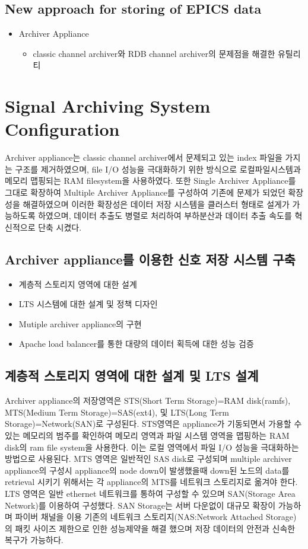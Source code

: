 \documentclass[11pt
  , a4paper
  , article
  , oneside
]{memoir}
\begin{document}
\subsection{New approach for storing of EPICS data}
\begin{itemize}
	\item Archiver Appliance
	\begin{itemize}
		\item classic channel archiver와 RDB channel archiver의 문제점을 해결한 유틸리티
	\end{itemize}
\end{itemize}
\section{Signal Archiving System Configuration}
Archiver appliance는 classic channel archiver에서 문제되고 있는 index 파일을 가지는 구조를 제거하였으며, file I/O 성능을 극대화하기 위한 방식으로 로컬파일시스템과 메모리 맵핑되는 RAM filesystem을 사용하였다. 또한 Single Archiver Appliance를 그대로 확장하여 Multiple Archiver Appliance를 구성하여 기존에 문제가 되었던 확장성을 해결하였으며 이러한 확장성은 데이터 저장 시스템을 클러스터 형태로 설게가 가능하도록 하였으며, 데이터 추출도 병렬로 처리하여 부하분산과 데이터 추출 속도를 혁신적으로 단축 시켰다.
\subsection{Archiver appliance를 이용한 신호 저장 시스템 구축}
\begin{itemize}
	\item 계층적 스토리지 영역에 대한 설계
	\item LTS 시스템에 대한 설계 및 정책 디자인
	\item Mutiple archiver appliance의 구현
	\item Apache load balancer를 통한 대량의 데이터 획득에 대한 성능 검증
\end{itemize}
\subsection{계층적 스토리지 영역에 대한 설계 및 LTS 설계}
Archiver appliance의 저장영역은 STS(Short Term Storage)=RAM disk(ramfs), \\MTS(Medium Term Storage)=SAS(ext4), 및 LTS(Long Term Storage)=Network(SAN)로 구성된다. STS영역은 appliance가 기동되면서 가용할 수 있는 메모리의 범주를 확인하여 메모리 영역과 파일 시스템 영역을 맵핑하는 RAM disk의 ram file system을 사용한다. 이는 로컬 영역에서 파일 I/O 성능을 극대화하는 방법으로 사용된다. MTS 영역은 일반적인 SAS disk로 구성되며 multiple archiver appliance의 구성시 appliance의 node down이 발생했을때 down된 노드의 data를 retrieval 시키기 위해서는 각 appliance의 MTS를 네트워크 스토리지로 옮겨야 한다. LTS 영역은 일반 ethernet 네트워크를 통하여 구성할 수 있으며 SAN(Storage Area Network)를 이용하여 구성했다. SAN Storage는 서버 다운없이 대규모 확장이 가능하며 파이버 채널을 이용 기존의 네트워크 스토리지(NAS:Network Attached Storage)의 패킷 사이즈 제한으로 인한 성능제약을 해결 했으며 저장 데이터의 안전과 신속한 복구가 가능하다.
\end{document}

